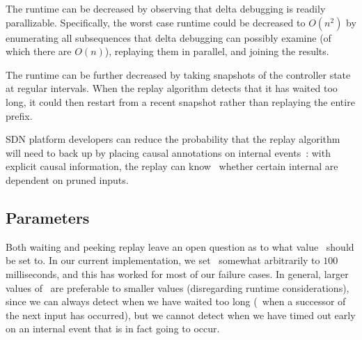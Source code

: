 The runtime can be decreased by observing that delta debugging is readily
parallizable. Specifically, the worst case runtime could be
decreased to $O(n^2)$ by enumerating all subsequences that delta debugging
can possibly examine (of which there are $O(n)$), replaying them in parallel, and joining the
results.

The runtime can be further decreased by taking snapshots of the controller
state at regular intervals. When the replay algorithm detects that it has waited too
long, it could then restart from a recent snapshot rather than replaying the
entire prefix.

SDN platform developers can reduce the probability that the replay algorithm
will need to back up by placing causal annotations on internal
events~\cite{fonseca2007x}: with explicit causal information, the replay can know
\apriori~whether certain internal are dependent on pruned inputs.


\subsection{Parameters}
\label{subsec:params}

Both waiting and peeking replay leave an open question as to what value
\textepsilon~should be set to. In our current implementation,
we set \textepsilon~\num{somewhat arbitrarily} to $100$ milliseconds, and this has worked for \num{most} of our
failure cases. In general, larger values of \textepsilon~are preferable to
smaller values (disregarding runtime considerations), since we can always
detect when we have waited too long (\viz~when a successor of the next input
has occurred), but we cannot detect when we have timed out
early on an internal event that is in fact going to occur.


